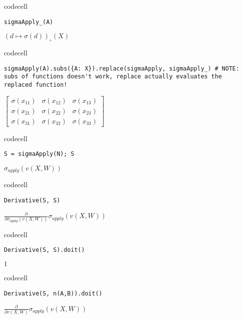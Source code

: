 codecell

\begin{verbatim}
sigmaApply_(A)
\end{verbatim}

$\displaystyle {\left( d \mapsto \sigma{\left(d \right)} \right)}_{\circ}\left({X}\right)$

codecell

\begin{verbatim}
sigmaApply(A).subs({A: X}).replace(sigmaApply, sigmaApply_) # NOTE: subs of functions doesn't work, replace actually evaluates the replaced function!
\end{verbatim}

$\displaystyle \left[\begin{matrix}\sigma{\left(x_{11} \right)} & \sigma{\left(x_{12} \right)} & \sigma{\left(x_{13} \right)}\\\sigma{\left(x_{21} \right)} & \sigma{\left(x_{22} \right)} & \sigma{\left(x_{23} \right)}\\\sigma{\left(x_{31} \right)} & \sigma{\left(x_{32} \right)} & \sigma{\left(x_{33} \right)}\end{matrix}\right]$

codecell

\begin{verbatim}
S = sigmaApply(N); S
\end{verbatim}

$\displaystyle \sigma_{apply}{\left(v{\left(X,W \right)} \right)}$

codecell

\begin{verbatim}
Derivative(S, S)
\end{verbatim}

$\displaystyle \frac{\partial}{\partial \sigma_{apply}{\left(v{\left(X,W \right)} \right)}} \sigma_{apply}{\left(v{\left(X,W \right)} \right)}$

codecell

\begin{verbatim}
Derivative(S, S).doit()
\end{verbatim}

$\displaystyle 1$

codecell

\begin{verbatim}
Derivative(S, n(A,B)).doit()
\end{verbatim}

$\displaystyle \frac{\partial}{\partial v{\left(X,W \right)}} \sigma_{apply}{\left(v{\left(X,W \right)} \right)}$

